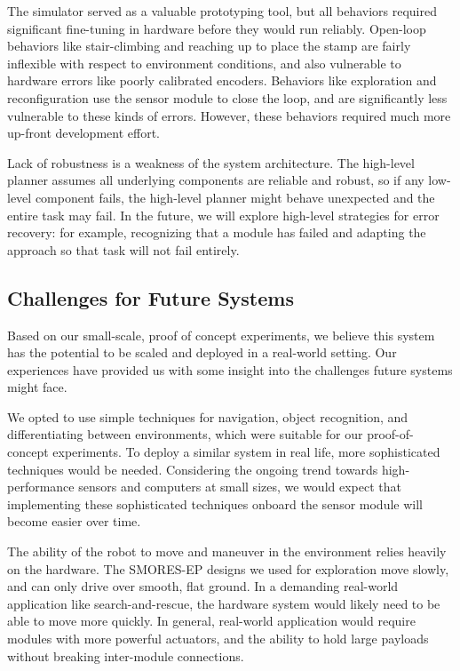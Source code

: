 \documentclass[journal]{IEEEtran}
\begin{document}
The simulator served as a valuable prototyping tool, but all behaviors required significant
fine-tuning in hardware before they would run reliably.  
Open-loop behaviors like stair-climbing and reaching up to place the stamp are fairly
inflexible with respect to environment conditions, and also vulnerable to hardware
errors like poorly calibrated encoders.  
Behaviors like exploration and reconfiguration use the sensor module to close the
loop, and are significantly less vulnerable to these kinds of errors.  
However, these behaviors required much more up-front development effort.

Lack of robustness is  a weakness of the system architecture.  The high-level planner assumes all underlying components are reliable and robust, so if any low-level component fails, the high-level planner might behave unexpected and the entire task may fail. In the future, we will explore high-level strategies for error recovery: for example, recognizing that a module has failed and adapting the approach so that task will not fail entirely.
%
\subsection{Challenges for Future Systems}
%
Based on our small-scale, proof of concept experiments, we believe this system has the potential to be scaled and deployed in a real-world setting. Our experiences have provided us with some insight into the challenges future systems might face.

We opted to use simple techniques for navigation, object recognition, and differentiating between environments, which were suitable for our proof-of-concept experiments. To deploy a similar system in real life, more sophisticated techniques would be needed. Considering the ongoing trend towards high-performance sensors and computers at small sizes, we would expect that implementing these sophisticated techniques onboard the sensor module will become easier over time.

The ability of the robot to move and maneuver in the environment relies heavily on the hardware.  The SMORES-EP designs we used for exploration move slowly, and can only drive over smooth, flat ground.  In a demanding real-world application like search-and-rescue, the hardware system would likely need to be able to move more quickly.  In general, real-world application would require modules with more powerful actuators, and the ability to hold large payloads without breaking inter-module connections.
\end{document}
